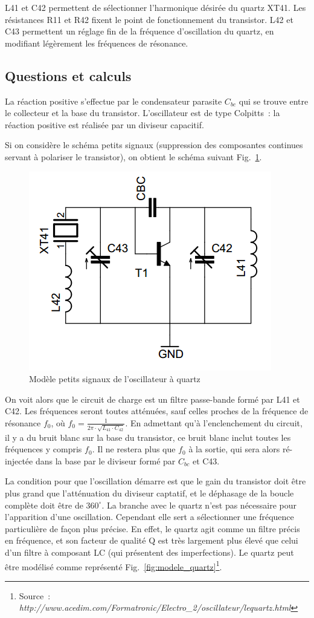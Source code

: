 \documentclass{article}
\begin{document}
L41 et C42 permettent de sélectionner l'harmonique désirée du quartz XT41. Les résistances R11 et R42 fixent le point de fonctionnement du transistor. L42 et C43 permettent un réglage fin de la fréquence d'oscillation du quartz, en modifiant légèrement les fréquences de résonance.



\subsection{Questions et calculs}


La réaction positive s'effectue par le condensateur parasite $C_{bc}$ qui se trouve entre le collecteur et la base du transistor.
L'oscillateur est de type Colpitts~: la réaction positive est réalisée par un diviseur capacitif.

Si on considère le schéma petits signaux (suppression des composantes continues servant à polariser le transistor), on obtient le schéma suivant Fig.~\ref{fig:osc_quartz_ac}.

\begin{figure}[h]
	\centering
	\includegraphics[width=0.4\linewidth]{shema_petit_signaux_oscillateur.png}
	\caption{Modèle petits signaux de l'oscillateur à quartz}
	\label{fig:osc_quartz_ac}
\end{figure}

On voit alors que le circuit de charge est un filtre passe-bande formé par L41 et C42. Les fréquences seront toutes atténuées, sauf celles proches de la fréquence de résonance $f_0$, où $f_0 = \frac{1}{2 \pi \cdot \sqrt{L_{41} \cdot C_{42}}}$.
En admettant qu'à l'enclenchement du circuit, il y a du bruit blanc sur la base du transistor, ce bruit blanc inclut toutes les fréquences y compris $f_0$. Il ne restera plus que $f_0$ à la sortie, qui sera alors ré-injectée dans la base par le diviseur formé par $C_{bc}$ et C43.

La condition pour que l'oscillation démarre est que le gain du transistor doit être plus grand que l'atténuation du diviseur captatif, et le déphasage de la boucle complète doit être de $\mathrm{360^{\circ}}$. La branche avec le quartz n'est pas nécessaire pour l'apparition d'une oscillation. Cependant elle sert a sélectionner une fréquence particulière de façon plus précise. En effet, le quartz agit comme un filtre précis en fréquence, et son facteur de qualité Q est très largement plus élevé que celui d'un filtre à composant LC (qui présentent des imperfections). Le quartz peut être modélisé comme représenté Fig.~\ref{fig:modele_quartz}\footnote{Source~: \textit{http://www.acedim.com/Formatronic/Electro\_2/oscillateur/lequartz.html}}.
\end{document}
